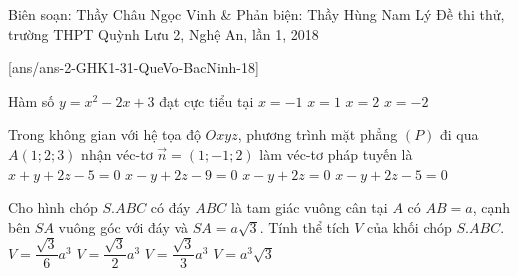 \begin{name}
{Biên soạn: Thầy Châu Ngọc Vinh \& Phản biện: Thầy Hùng Nam Lý}
{Đề thi thử, trường THPT Quỳnh Lưu 2, Nghệ An, lần 1, 2018}
\end{name}
\setcounter{ex}{0}
[ans/ans-2-GHK1-31-QueVo-BacNinh-18]
\begin{ex}%
Hàm số $ y=x^2-2x+3 $ đạt cực tiểu tại
\choice
{$ x=-1 $}
{\True $ x=1 $}
{$ x=2 $}
{$ x=-2 $}
\end{ex}

\begin{ex}%
	Trong không gian với hệ tọa độ $ Oxyz $, phương trình mặt phẳng $ (P) $ đi qua $ A(1;2;3) $ nhận véc-tơ $ \vec{n}=(1;-1;2) $ làm véc-tơ pháp tuyến là
	\choice
	{$ x+y+2z-5=0 $}
	{$ x-y+2z-9=0 $}
	{$ x-y+2z=0 $}
	{\True $ x-y+2z-5=0 $}
\end{ex}

\begin{ex}%
	Cho hình chóp $ S.ABC $ có đáy $ ABC $ là tam giác vuông cân tại $ A $ có $ AB=a $, cạnh bên $ SA $ vuông góc với đáy và $ SA=a\sqrt{3} $. Tính thể tích $ V $ của khối chóp $ S.ABC $.
	\choice
	{\True $ V=\dfrac{\sqrt{3}}{6}a^3 $}
	{$ V=\dfrac{\sqrt{3}}{2}a^3 $}
	{$ V=\dfrac{\sqrt{3}}{3}a^3 $}
	{$ V=a^3\sqrt{3} $}
\end{ex}

